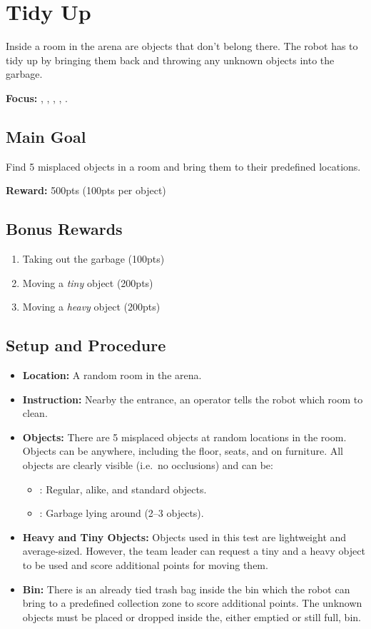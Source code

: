 \section{Tidy Up}
\label{test:tidy-up}
 Inside a room in the arena are objects that don't belong there. The robot has to tidy up by bringing them back and throwing any unknown objects into the garbage.

\noindent \textbf{Focus:} \SysI, \NAV, \CV, \OR, \MAN.

\subsection*{Main Goal}
Find 5 misplaced objects in a room and bring them to their predefined locations.

\noindent\textbf{Reward:} 500pts (100pts per object)

\subsection*{Bonus Rewards}
\begin{enumerate}[nosep]
	\item Taking out the garbage (100pts)
	\item Moving a \emph{tiny} object (200pts)
	\item Moving a \emph{heavy} object (200pts)
\end{enumerate}


\subsection*{Setup and Procedure}
\begin{itemize}[nosep]
	\item \textbf{Location:} A random room in the arena.
	\item \textbf{Instruction:} Nearby the entrance, an operator tells the robot which room to clean.
	\item \textbf{Objects:} There are 5 misplaced objects at random locations in the room. Objects can be anywhere, including the floor, seats, and on furniture.
	All objects are clearly visible (i.e.~no occlusions) and can be:
	\begin{itemize}[nosep]
		\item\KnownObjects{}: Regular, alike, and standard objects.
		\item\UnknownObjects{}: Garbage lying around (2--3 objects).
	\end{itemize}
	\item \textbf{Heavy and Tiny Objects:} Objects used in this test are lightweight and average-sized.
	However, the team leader can request a tiny and a heavy object to be used and score additional points for moving them.
	\item \textbf{Bin:} There is an already tied trash bag inside the bin which the robot can bring to a predefined collection zone to score additional points. The unknown objects must be placed or dropped inside the, either emptied or still full, bin.
\end{itemize}

